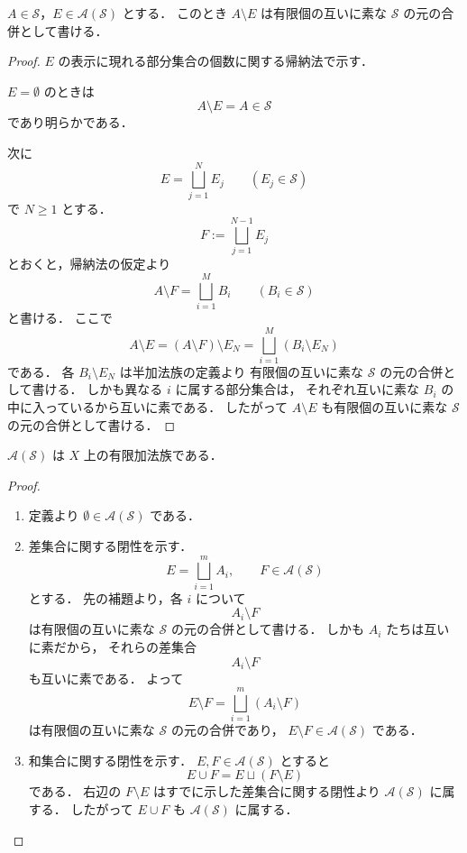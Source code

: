 \begin{lemma}
$A \in \mathcal S$，$E \in \mathcal A(\mathcal S)$ とする．
このとき $A \setminus E$ は有限個の互いに素な
$\mathcal S$ の元の合併として書ける．
\end{lemma}
\begin{proof}
$E$ の表示に現れる部分集合の個数に関する帰納法で示す．

$E=\emptyset$ のときは
\[
A \setminus E = A \in \mathcal S
\]
であり明らかである．

次に
\[
E=\bigsqcup_{j=1}^N E_j
\qquad
(E_j \in \mathcal S)
\]
で $N \ge 1$ とする．
\[
F:=\bigsqcup_{j=1}^{N-1}E_j
\]
とおくと，帰納法の仮定より
\[
A \setminus F=\bigsqcup_{i=1}^M B_i
\qquad
(B_i \in \mathcal S)
\]
と書ける．
ここで
\[
A \setminus E=(A \setminus F)\setminus E_N
=
\bigsqcup_{i=1}^M (B_i \setminus E_N)
\]
である．
各 $B_i \setminus E_N$ は半加法族の定義より
有限個の互いに素な $\mathcal S$ の元の合併として書ける．
しかも異なる $i$ に属する部分集合は，
それぞれ互いに素な $B_i$ の中に入っているから互いに素である．
したがって $A \setminus E$ も有限個の互いに素な
$\mathcal S$ の元の合併として書ける．
\end{proof}

\begin{proposition}
$\mathcal A(\mathcal S)$ は $X$ 上の有限加法族である．
\end{proposition}
\begin{proof}
\begin{enumerate}
    \item 定義より $\emptyset \in \mathcal A(\mathcal S)$ である．

    \item 差集合に関する閉性を示す．
    \[
    E=\bigsqcup_{i=1}^m A_i,
    \qquad
    F \in \mathcal A(\mathcal S)
    \]
    とする．
    先の補題より，各 $i$ について
    \[
    A_i \setminus F
    \]
    は有限個の互いに素な $\mathcal S$ の元の合併として書ける．
    しかも $A_i$ たちは互いに素だから，
    それらの差集合
    \[
    A_i \setminus F
    \]
    も互いに素である．
    よって
    \[
    E \setminus F
    =
    \bigsqcup_{i=1}^m (A_i \setminus F)
    \]
    は有限個の互いに素な $\mathcal S$ の元の合併であり，
    $E \setminus F \in \mathcal A(\mathcal S)$ である．

    \item 和集合に関する閉性を示す．
    $E,F \in \mathcal A(\mathcal S)$ とすると
    \[
    E \cup F = E \sqcup (F \setminus E)
    \]
    である．
    右辺の $F \setminus E$ はすでに示した差集合に関する閉性より
    $\mathcal A(\mathcal S)$ に属する．
    したがって $E \cup F$ も
    $\mathcal A(\mathcal S)$ に属する．
\end{enumerate}
\end{proof}

